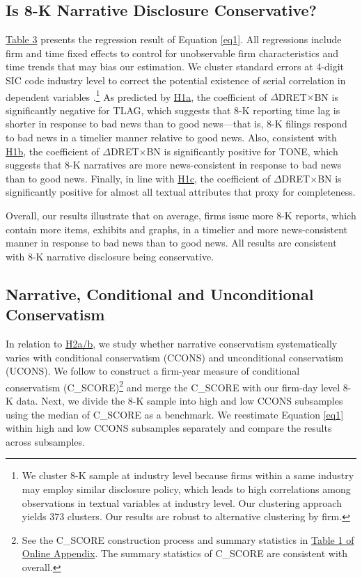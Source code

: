 \documentclass[letterpaper,12pt]{article}
\begin{document}
\begin{spacing}{1.5}
\subsection{Is 8-K Narrative Disclosure Conservative?}
\noindent \hyperref[T3]{Table 3} presents the regression result of Equation \eqref{eq1}. All regressions include firm and time fixed effects to control for unobservable firm characteristics and time trends that may bias our estimation. We cluster standard errors at 4-digit SIC code industry level to correct the potential existence of serial correlation in dependent variables \cite{petersenEstimatingStandardErrors2009}.\footnote{We cluster 8-K sample at industry level because firms within a same industry may employ similar disclosure policy, which leads to high correlations among observations in textual variables at industry level. Our clustering approach yields 373 clusters. Our results are robust to alternative clustering by firm. } As predicted by \hyperref[hyp:h1a]{H1a}, the coefficient of $\Delta$DRET$\times$BN is significantly negative for TLAG,
which suggests that 8-K reporting time lag is shorter in response to bad news than to good news---that is, 8-K filings respond to bad news in a timelier manner relative to good news. Also, consistent with \hyperref[hyp:h1b]{H1b}, the coefficient of $\Delta$DRET$\times$BN is significantly positive for TONE, which suggests that 8-K narratives are more news-consistent in response to bad news than to good news. Finally, in line with \hyperref[hyp:h1c]{H1c}, the coefficient of $\Delta$DRET$\times$BN is significantly positive for almost all textual attributes that proxy for completeness.

Overall, our results illustrate that on average, firms issue more 8-K reports, which contain more items, exhibits and graphs, in a timelier and more news-consistent manner in response to bad news than to good news. All results are consistent with 8-K narrative disclosure being conservative.

\subsection{Narrative, Conditional and Unconditional Conservatism}
\noindent In relation to \hyperref[hyp:h2a]{H2a/b}, we study whether narrative conservatism systematically varies with conditional conservatism (CCONS) and unconditional conservatism (UCONS). 
We follow  to construct a firm-year measure of conditional conservatism (C\_SCORE)\footnote{See the C\_SCORE construction process and summary statistics in \hyperref[OAT1]{Table 1 of Online Appendix}. The summary statistics of C\_SCORE are consistent with  overall. } and merge the C\_SCORE with our firm-day level 8-K data. Next, we divide the 8-K sample into high and low CCONS subsamples using the median of C\_SCORE as a benchmark. We reestimate Equation \eqref{eq1} within high and low CCONS subsamples separately and compare the results across subsamples.


\end{spacing}
\end{document}
